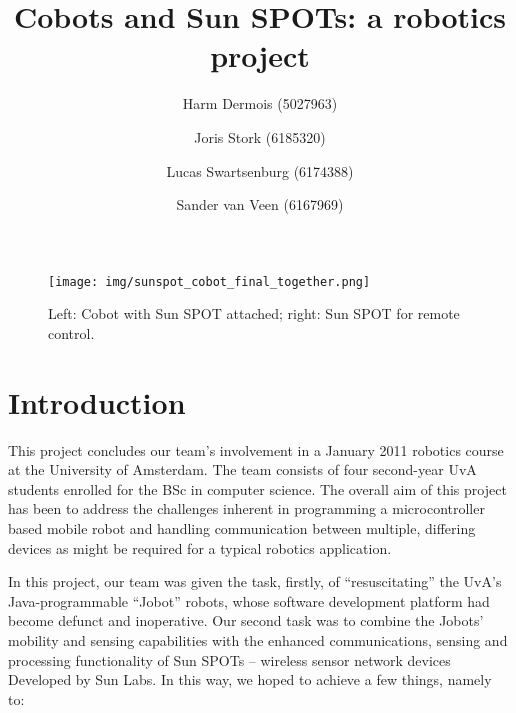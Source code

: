 \documentclass[a4paper,10pt]{article} %
\author{Harm Dermois (5027963) \and Joris Stork (6185320) \and
Lucas Swartsenburg (6174388) \and Sander van Veen (6167969)}
\title{Cobots and Sun SPOTs: a robotics project}
\begin{document}
\maketitle

\thispagestyle{empty}

\begin{figure}[H]
\label{fig:cobot_sunspot_final}
\centering
\texttt{[image: img/sunspot\_cobot\_final\_together.png]}
\caption{Left: Cobot with Sun SPOT attached; right: Sun SPOT for remote control.}
\end{figure}


\pagebreak

\tableofcontents

\pagebreak

\section{Introduction} %

This project concludes our team's involvement in a January 2011 robotics course
at the University of Amsterdam. The team consists of four second-year UvA
students enrolled for the BSc in computer science. The overall aim of this
project has been to address the challenges inherent in programming a
microcontroller based mobile robot and handling communication between multiple,
differing devices as might be required for a typical robotics application.

In this project, our team was given the task, firstly, of ``resuscitating'' the
UvA's Java-programmable ``Jobot'' robots, whose software development platform
had become defunct and inoperative. Our second task was to combine the Jobots'
mobility and sensing capabilities with the enhanced communications, sensing and
processing functionality of Sun SPOTs -- wireless sensor network devices
Developed by Sun Labs. In this way, we hoped to achieve a few things, namely to:
\end{document}
